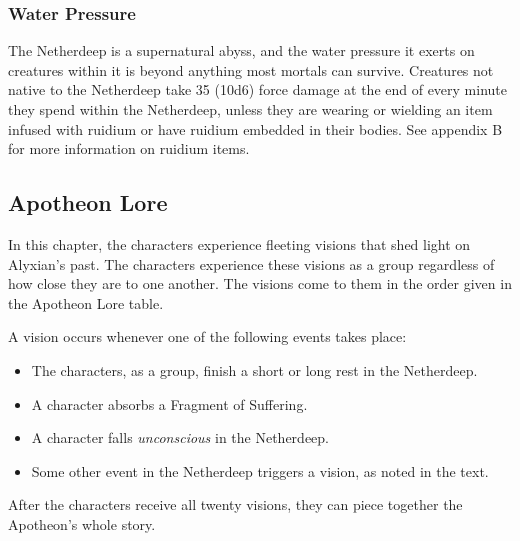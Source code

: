 \documentclass[a4paper, 11pt, bg=full, twocolumn, nooutline]{dndbook}
\begin{document}
\subsubsection{Water Pressure}

The Netherdeep is a supernatural abyss, and the water pressure it exerts on creatures within it is beyond anything most mortals can survive. Creatures not native to the Netherdeep take 35 (10d6) force damage at the end of every minute they spend within the Netherdeep, unless they are wearing or wielding an item infused with ruidium or have ruidium embedded in their bodies. See appendix B for more information on ruidium items.

\subsection{Apotheon Lore}

In this chapter, the characters experience fleeting visions that shed light on Alyxian's past. The characters experience these visions as a group regardless of how close they are to one another. The visions come to them in the order given in the Apotheon Lore table.

A vision occurs whenever one of the following events takes place:

\begin{itemize}
\item The characters, as a group, finish a short or long rest in the Netherdeep.
\item A character absorbs a Fragment of Suffering.
\item A character falls \textit{unconscious} in the Netherdeep.
\item Some other event in the Netherdeep triggers a vision, as noted in the text.
\end{itemize}

After the characters receive all twenty visions, they can piece together the Apotheon's whole story.
\end{document}
